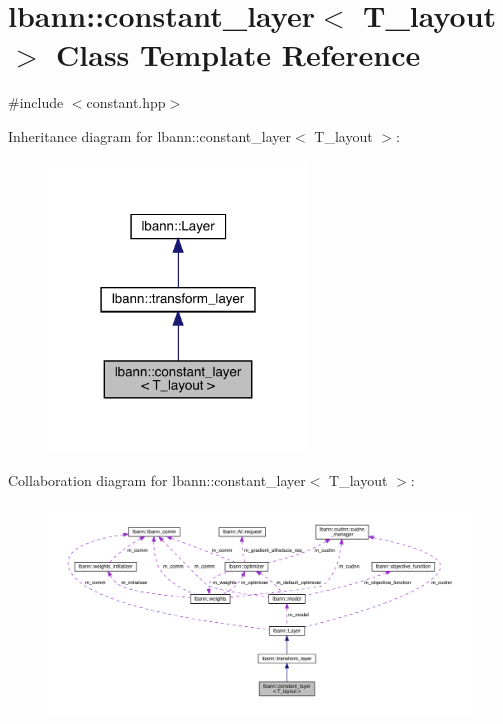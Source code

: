 \hypertarget{classlbann_1_1constant__layer}{}\section{lbann\+:\+:constant\+\_\+layer$<$ T\+\_\+layout $>$ Class Template Reference}
\label{classlbann_1_1constant__layer}


{\ttfamily \#include $<$constant.\+hpp$>$}



Inheritance diagram for lbann\+:\+:constant\+\_\+layer$<$ T\+\_\+layout $>$\+:\nopagebreak
\begin{figure}[H]
\begin{center}
\leavevmode
\includegraphics[width=195pt]{classlbann_1_1constant__layer__inherit__graph}
\end{center}
\end{figure}


Collaboration diagram for lbann\+:\+:constant\+\_\+layer$<$ T\+\_\+layout $>$\+:\nopagebreak
\begin{figure}[H]
\begin{center}
\leavevmode
\includegraphics[width=350pt]{classlbann_1_1constant__layer__coll__graph}
\end{center}
\end{figure}
